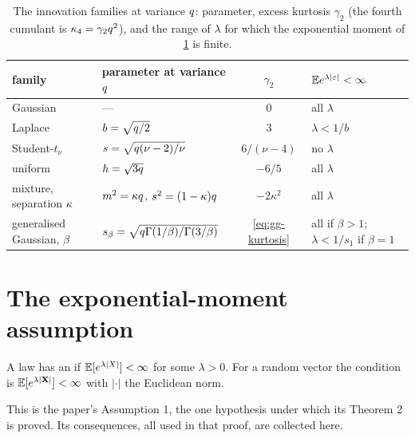 \begin{table}[t]
\centering
\caption{The innovation families at variance $q$: parameter, excess kurtosis
$\gamma_2$ (the fourth cumulant is $\kappa_4=\gamma_2q^2$), and the range of
$\lambda$ for which the exponential moment of \cref{sec:expmoment} is finite.}
\label{tab:families}
\footnotesize
\begin{tabular}{@{}llcl@{}}
\toprule
family & parameter at variance $q$ & $\gamma_2$ & $\mathbb{E} e^{\lambda|\varepsilon|}<\infty$ \\
\midrule
Gaussian & --- & $0$ & all $\lambda$ \\
Laplace & $b=\sqrt{q/2}$ & $3$ & $\lambda<1/b$ \\
Student-$t_\nu$ & $s=\sqrt{q(\nu-2)/\nu}$ & $6/(\nu-4)$ & no $\lambda$ \\
uniform & $h=\sqrt{3q}$ & $-6/5$ & all $\lambda$ \\
mixture, separation $\kappa$ & $m^2=\kappa q$, $s^2=(1-\kappa)q$ & $-2\kappa^2$ & all $\lambda$ \\
generalised Gaussian, $\beta$ & $s_\beta=\sqrt{q\Gamma(1/\beta)/\Gamma(3/\beta)}$ & \cref{eq:gg-kurtosis} & all if $\beta>1$; $\lambda<1/s_1$ if $\beta=1$ \\
\bottomrule
\end{tabular}
\end{table}

\section{The exponential-moment assumption}
\label{sec:expmoment}

\begin{assumption}
\label{ass:expmoment}
A law has an  if $\mathbb{E}[e^{\lambda|X|}]<\infty$ for some $\lambda>0$.
For a random vector the condition is $\mathbb{E}[e^{\lambda|\mathbf{X}|}]<\infty$ with $|\cdot|$
the Euclidean norm.
\end{assumption}

This is the paper's Assumption 1, the one hypothesis under which its Theorem 2 is
proved. Its consequences, all used in that proof, are collected here.

